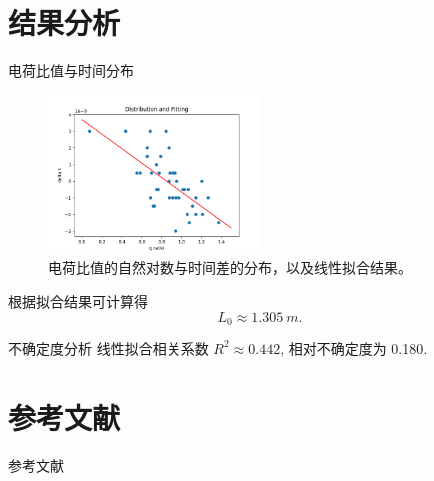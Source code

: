 \documentclass[10pt]{beamer}
\begin{document}
\section{结果分析}
\label{sec:orgc25006c}
\begin{frame}[label={sec:org93946de}]{电荷比值与时间分布}
\begin{figure}[htbp]
\centering
\includegraphics[width=0.5\textwidth]{../AttenuationLength/figs/dist.png}
\caption{电荷比值的自然对数与时间差的分布，以及线性拟合结果。}
\end{figure}

根据拟合结果可计算得
\begin{equation}
\label{eq:3}
L_0 \approx \qty{1.305}{m}.
\end{equation}
\end{frame}
\begin{frame}[label={sec:orgd4b6778}]{不确定度分析}
线性拟合相关系数 \(R^2 \approx 0.442\), 相对不确定度为 0.180.
\end{frame}
\section{参考文献}
\label{sec:orgf6ca842}
\begin{frame}[allowframebreaks]{参考文献}
\end{frame}
\end{document}
